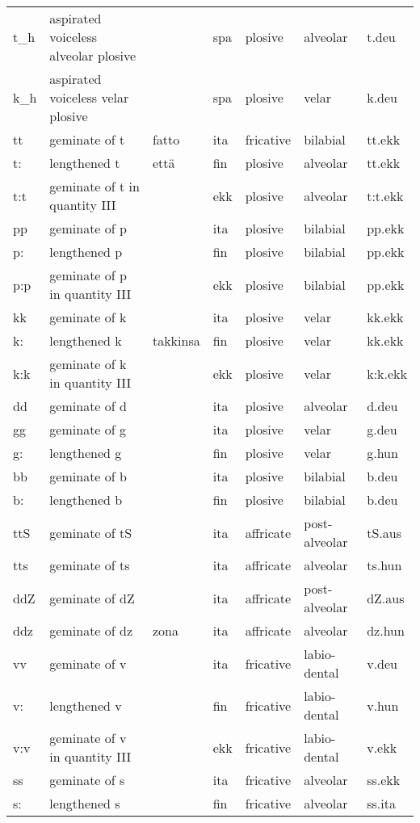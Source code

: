 \begin{longtable}{l|l|l|l|l|l|l}
t\_h	& aspirated voiceless alveolar plosive	& 	& spa	& plosive	& alveolar	& t.deu\\
k\_h	& aspirated voiceless velar plosive	& 	& spa	& plosive	& velar	& k.deu\\
tt	& geminate of t	& fatto	& ita	& fricative	& bilabial	& tt.ekk\\
t:	& lengthened t	& että	& fin	& plosive	& alveolar	& tt.ekk\\
t:t	& geminate of t in quantity III	& 	& ekk	& plosive	& alveolar	& t:t.ekk\\
pp	& geminate of p	& 	& ita	& plosive	& bilabial	& pp.ekk\\
p:	& lengthened p	& 	& fin	& plosive	& bilabial	& pp.ekk\\
p:p	& geminate of p in quantity III	& 	& ekk	& plosive	& bilabial	& pp.ekk\\
kk	& geminate of k	& 	& ita	& plosive	& velar	& kk.ekk\\
k:	& lengthened k	& takkinsa	& fin	& plosive	& velar	& kk.ekk\\
k:k	& geminate of k in quantity III	& 	& ekk	& plosive	& velar	& k:k.ekk\\
dd	& geminate of d	& 	& ita	& plosive	& alveolar	& d.deu\\
gg	& geminate of g	& 	& ita	& plosive	& velar	& g.deu\\
g:	& lengthened g	& 	& fin	& plosive	& velar	& g.hun\\
bb	& geminate of b	& 	& ita	& plosive	& bilabial	& b.deu\\
b:	& lengthened b	& 	& fin	& plosive	& bilabial	& b.deu\\
ttS	& geminate of tS	& 	& ita	& affricate	& post-alveolar	& tS.aus\\
tts	& geminate of ts	& 	& ita	& affricate	& alveolar	& ts.hun\\
ddZ	& geminate of dZ	& 	& ita	& affricate	& post-alveolar	& dZ.aus\\
ddz	& geminate of dz	& zona	& ita	& affricate	& alveolar	& dz.hun\\
vv	& geminate of v	& 	& ita	& fricative	& labio-dental	& v.deu\\
v:	& lengthened v	& 	& fin	& fricative	& labio-dental	& v.hun\\
v:v	& geminate of v in quantity III	& 	& ekk	& fricative	& labio-dental	& v.ekk\\
ss	& geminate of s	& 	& ita	& fricative	& alveolar	& ss.ekk\\
s:	& lengthened s	& 	& fin	& fricative	& alveolar	& ss.ita\\

\end{longtable}
